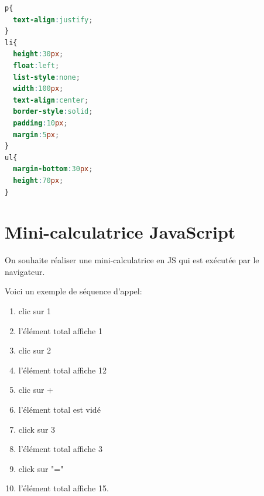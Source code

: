 \documentclass[a4paper,11pt]{exam}
\begin{document}
\begin{questions}
\begin{multicols}{3}
\begin{solutionorlines}[6.8cm]
\begin{lstlisting}[frame=leftline,language={CSS},numbers=none]
p{
  text-align:justify;
}
li{
  height:30px;
  float:left;
  list-style:none;
  width:100px;
  text-align:center;
  border-style:solid;
  padding:10px;
  margin:5px;
}
ul{
  margin-bottom:30px;
  height:70px;
}
		\end{lstlisting}
  \end{solutionorlines}
  \begin{solutionorlines}[6.8cm]
  \end{solutionorlines}
  \begin{solutionorlines}[6.7cm]
  \end{solutionorlines}
\end{multicols}

\end{questions}


 \section{Mini-calculatrice JavaScript}

 On souhaite réaliser une mini-calculatrice en JS qui est exécutée par le navigateur.
 \begin{center}
	\end{center}
 Voici un exemple de séquence d'appel:
 \begin{enumerate}
	\scriptsize \itemsep0em 
	\item clic sur 1 
	\item l'élément total affiche 1
	\item clic sur 2
	\item l'élément total affiche 12
	\item clic sur +
	\item l'élément total est vidé
	\item click sur 3
	\item l'élément total affiche 3
	\item click sur "="
	\item l'élément total affiche 15.
 \end{enumerate}
 
\end{document}
